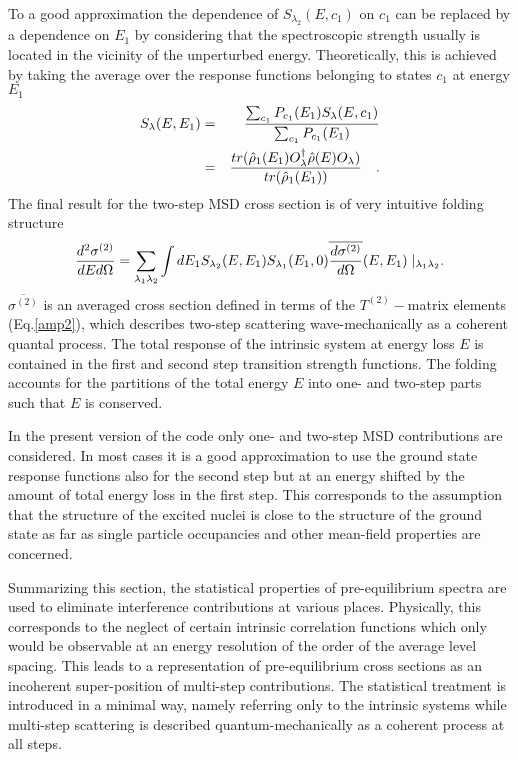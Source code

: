 To a good approximation the dependence of $S_{\lambda_{2}}(E,c_{1})$ on $%
c_{1}$ can be replaced by a dependence on $E_{1}$ by considering that the
spectroscopic strength usually is located in the vicinity of the unperturbed
energy. Theoretically, this is achieved by taking the average over the
response functions belonging to states $c_{1}$ at energy $E_{1}$
\begin{eqnarray}
S_{\lambda}(E,E_{1}) & = & \frac{\sum_{c_{1}}{P_{c_{1}}(E_{1})S_{%
\lambda}(E,c_{1})}}{\sum_{c_{1}}{P_{c_{1}}(E_{1})}}  \notag \\
& = & \frac{tr(\hat{\rho}_{1}(E_{1})O_{\lambda}^{\dag}\hat{\rho}%
(E)O_{\lambda})}{tr(\hat{\rho}_{1}(E_{1}))}\quad.  \label{slave}
\end{eqnarray}
\noindent The final result for the two-step MSD%
 cross section is of very intuitive folding structure
\begin{equation}
\frac{d^{2}\sigma^{(2)}}{dEd\Omega}=\sum_{\lambda_{1}\lambda_{2}}{\int
dE_{1}S_{\lambda_{2}}(E,E_{1})S_{\lambda_{1}}(E_{1},0)\overline{\frac{%
d\sigma^{(2)}}{d\Omega}}(E,E_{1})\mid_{\lambda_{1}\lambda_{2}}}.
\label{sigma2}
\end{equation}
\noindent $\overline{\sigma^{(2)}}$ is an averaged cross section defined in
terms of the $T^{(2)}-$matrix elements (Eq.\ref{amp2}), which describes
two-step scattering wave-mechanically as a coherent quantal process. The
total response of the intrinsic system at energy loss $E$ is contained in
the first and second step transition strength functions. The folding
accounts for the partitions of the total energy $E$ into one- and two-step
parts such that $E$ is conserved.

In the present version of the code only one- and two-step MSD%
 contributions are considered. In most cases it is a good
approximation to use the ground state response functions also for the second
step but at an energy shifted by the amount of total energy loss in the
first step. This corresponds to the assumption that the structure of the
excited nuclei is close to the structure of the ground state as far as
single particle occupancies and other mean-field properties are concerned.

Summarizing this section, the statistical properties of pre-equilibrium
spectra are used to eliminate interference contributions at various places.
Physically, this corresponds to the neglect of certain intrinsic correlation
functions which only would be observable at an energy resolution of the
order of the average level spacing. This leads to a representation of
pre-equilibrium cross sections as an incoherent super-position of multi-step
contributions. The statistical treatment is introduced in a minimal way,
namely referring only to the intrinsic systems while multi-step scattering
is described quantum-mechanically as a coherent process at all steps.

